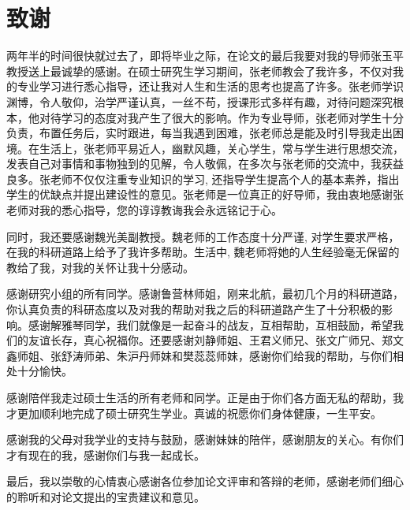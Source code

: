 \chapter{致谢}
两年半的时间很快就过去了，即将毕业之际，在论文的最后我要对我的导师张玉平教授送上最诚挚的感谢。在硕士研究生学习期间，张老师教会了我许多，不仅对我的专业学习进行悉心指导，还让我对人生和生活的思考也提高了许多。张老师学识渊博，令人敬仰，治学严谨认真，一丝不苟，授课形式多样有趣，对待问题深究根本，他对待学习的态度对我产生了很大的影响。作为专业导师，张老师对学生十分负责，布置任务后，实时跟进，每当我遇到困难，张老师总是能及时引导我走出困境。在生活上，张老师平易近人，幽默风趣，关心学生，常与学生进行思想交流，发表自己对事情和事物独到的见解，令人敬佩，在多次与张老师的交流中，我获益良多。张老师不仅仅注重专业知识的学习, 还指导学生提高个人的基本素养，指出学生的优缺点并提出建设性的意见。张老师是一位真正的好导师，我由衷地感谢张老师对我的悉心指导，您的谆谆教诲我会永远铭记于心。

同时，我还要感谢魏光美副教授。魏老师的工作态度十分严谨, 对学生要求严格，在我的科研道路上给予了我许多帮助。生活中, 魏老师将她的人生经验毫无保留的教给了我，对我的关怀让我十分感动。

%

感谢研究小组的所有同学。感谢鲁营林师姐，刚来北航，最初几个月的科研道路，你认真负责的科研态度以及对我的帮助对我之后的科研道路产生了十分积极的影响。感谢解雅琴同学，我们就像是一起奋斗的战友，互相帮助，互相鼓励，希望我们的友谊长存，真心祝福你。还要感谢刘静师姐、王君义师兄、张文广师兄、郑文鑫师姐、张舒涛师弟、朱沪丹师妹和樊蕊蕊师妹，感谢你们给我的帮助，与你们相处十分愉快。

感谢陪伴我走过硕士生活的所有老师和同学。正是由于你们各方面无私的帮助，我才更加顺利地完成了硕士研究生学业。真诚的祝愿你们身体健康，一生平安。

感谢我的父母对我学业的支持与鼓励，感谢妹妹的陪伴，感谢朋友的关心。有你们才有现在的我，感谢你们与我一起成长。

最后，我以崇敬的心情衷心感谢各位参加论文评审和答辩的老师，感谢老师们细心的聆听和对论文提出的宝贵建议和意见。

